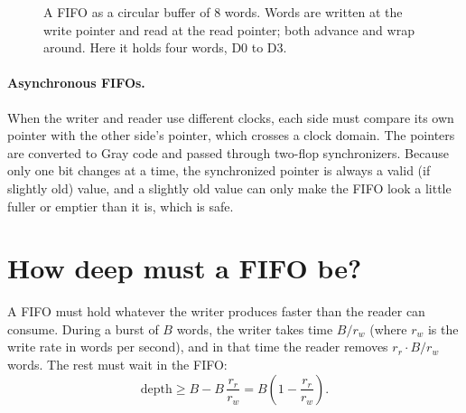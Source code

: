 \begin{figure}[h]
\centering
{}
\caption{A FIFO as a circular buffer of 8 words. Words are written at the write pointer and read at the read pointer; both advance and wrap around. Here it holds four words, D0 to D3.}
\label{fig:fifo}
\end{figure}

\paragraph{Asynchronous FIFOs.} When the writer and reader use different clocks, each side must compare its own pointer with the other side's pointer, which crosses a clock domain. The pointers are converted to Gray code and passed through two-flop synchronizers. Because only one bit changes at a time, the synchronized pointer is always a valid (if slightly old) value, and a slightly old value can only make the FIFO look a little fuller or emptier than it is, which is safe.

\section{How deep must a FIFO be?}
\label{sec:fifodepth}

\begin{bigidea}
A FIFO must hold whatever the writer produces faster than the reader can consume. During a burst of $B$ words, the writer takes time $B/r_w$ (where $r_w$ is the write rate in words per second), and in that time the reader removes $r_r \cdot B/r_w$ words. The rest must wait in the FIFO:
\[
  \text{depth} \ge B - B\,\frac{r_r}{r_w} = B\left(1 - \frac{r_r}{r_w}\right).
\]
\end{bigidea}

